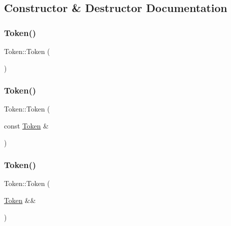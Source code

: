\subsection{Constructor \& Destructor Documentation}
\mbox{\label{class_token_a761bf97d165988a4250dc26500d36f89}} 
\subsubsection{\texorpdfstring{Token()}{Token()}\hspace{0.1cm}{\footnotesize\ttfamily [1/6]}}
{\footnotesize\ttfamily Token\+::\+Token (\begin{DoxyParamCaption}{ }\end{DoxyParamCaption})\hspace{0.3cm}{\ttfamily [default]}}

\mbox{\label{class_token_a350ebd7ea16caa846b858ecdb1c273c6}} 
\subsubsection{\texorpdfstring{Token()}{Token()}\hspace{0.1cm}{\footnotesize\ttfamily [2/6]}}
{\footnotesize\ttfamily Token\+::\+Token (\begin{DoxyParamCaption}\item[{const \hyperlink{class_token}{Token} \&}]{ }\end{DoxyParamCaption})\hspace{0.3cm}{\ttfamily [default]}}

\mbox{\label{class_token_afc9d412fe95cc74013031eb46eb5d924}} 
\subsubsection{\texorpdfstring{Token()}{Token()}\hspace{0.1cm}{\footnotesize\ttfamily [3/6]}}
{\footnotesize\ttfamily Token\+::\+Token (\begin{DoxyParamCaption}\item[{\hyperlink{class_token}{Token} \&\&}]{ }\end{DoxyParamCaption})\hspace{0.3cm}{\ttfamily [default]}}

